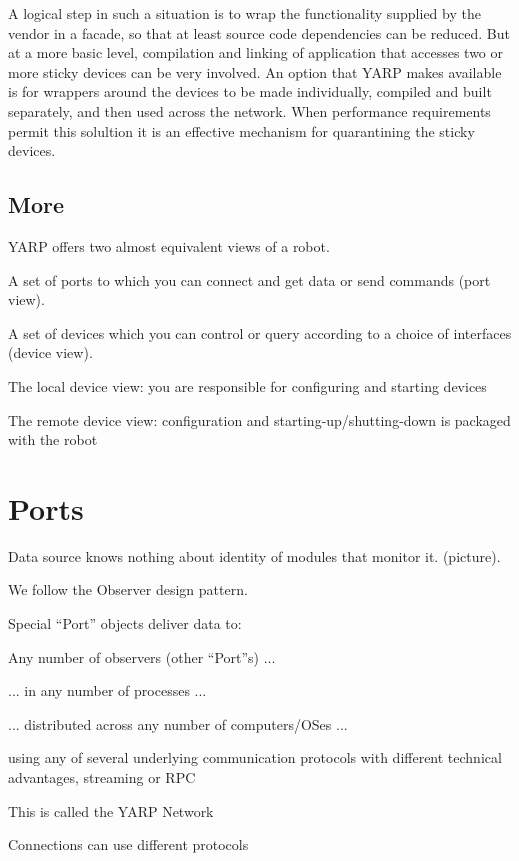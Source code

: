 A logical step in such a situation is to wrap the functionality
supplied by the vendor in a facade, so that at least source code
dependencies can be reduced.  But at a more basic level,
compilation and linking of application that accesses two or more
sticky devices can be very involved.  An option that YARP makes
available is for wrappers around the devices to be made individually,
compiled and built separately, and then used across the network.
When performance requirements permit this solultion it is an
effective mechanism for quarantining the sticky devices.






\subsection{More}


YARP offers two almost equivalent views of a robot.


A set of ports to which you can connect and get data or send commands
(port view).

A set of devices which you can control or query according to a choice
of interfaces (device view).

The local device view: you are responsible for configuring and starting devices

The remote device view: configuration and starting-up/shutting-down is
packaged with the robot



\section{Ports}

Data source knows nothing about identity of modules that monitor it.
(picture).

We follow the Observer design pattern. 

Special ``Port'' objects deliver data to:

Any number of observers (other ``Port''s) ...

... in any number of processes ...

... distributed across any number of computers/OSes ...

using any of several underlying communication protocols with different
technical advantages, streaming or RPC

This is called the YARP Network

Connections can use different protocols

